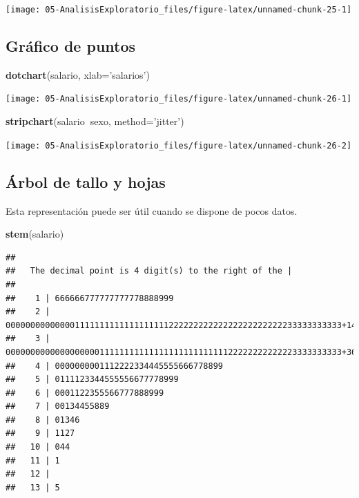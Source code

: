 \documentclass[]{book}
\newenvironment{Shaded}{\begin{snugshade}}{\end{snugshade}}
\newcommand{\DataTypeTok}[1]{\textcolor[rgb]{0.13,0.29,0.53}{#1}}
\newcommand{\KeywordTok}[1]{\textcolor[rgb]{0.13,0.29,0.53}{\textbf{#1}}}
\newcommand{\NormalTok}[1]{#1}
\newcommand{\OperatorTok}[1]{\textcolor[rgb]{0.81,0.36,0.00}{\textbf{#1}}}
\newcommand{\StringTok}[1]{\textcolor[rgb]{0.31,0.60,0.02}{#1}}
\begin{document}
\begin{center}\texttt{[image: 05-AnalisisExploratorio\_files/figure-latex/unnamed-chunk-25-1]} \end{center}

\hypertarget{grafico-de-puntos}{%
\subsection{Gráfico de puntos}\label{grafico-de-puntos}}

\begin{Shaded}
\begin{Highlighting}[]
\KeywordTok{dotchart}\NormalTok{(salario, }\DataTypeTok{xlab=}\StringTok{'salarios'}\NormalTok{)}
\end{Highlighting}
\end{Shaded}

\begin{center}\texttt{[image: 05-AnalisisExploratorio\_files/figure-latex/unnamed-chunk-26-1]} \end{center}

\begin{Shaded}
\begin{Highlighting}[]
\KeywordTok{stripchart}\NormalTok{(salario}\OperatorTok{~}\NormalTok{sexo, }\DataTypeTok{method=}\StringTok{'jitter'}\NormalTok{)}
\end{Highlighting}
\end{Shaded}

\begin{center}\texttt{[image: 05-AnalisisExploratorio\_files/figure-latex/unnamed-chunk-26-2]} \end{center}

\hypertarget{arbol-de-tallo-y-hojas}{%
\subsection{Árbol de tallo y hojas}\label{arbol-de-tallo-y-hojas}}

Esta representación puede ser útil cuando se dispone de pocos datos.

\begin{Shaded}
\begin{Highlighting}[]
\KeywordTok{stem}\NormalTok{(salario)}
\end{Highlighting}
\end{Shaded}

\begin{verbatim}
## 
##   The decimal point is 4 digit(s) to the right of the |
## 
##    1 | 666666777777777778888999
##    2 | 00000000000000111111111111111111122222222222222222222222233333333333+148
##    3 | 00000000000000000001111111111111111111111111122222222222223333333333+36
##    4 | 0000000001112222334445555666778899
##    5 | 0111123344555556677778999
##    6 | 0001122355566777888999
##    7 | 00134455889
##    8 | 01346
##    9 | 1127
##   10 | 044
##   11 | 1
##   12 | 
##   13 | 5
\end{verbatim}
\end{document}
